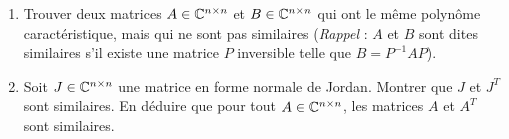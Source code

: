 \begin{enumerate}
\item Trouver deux matrices $A \in \Bbb C^{n \times n}$ et $B \in \Bbb C^{n \times n}$ qui ont le même polynôme caractéristique, mais qui ne sont pas similaires (\emph{Rappel} : $A$ et $B$ sont dites similaires s'il existe une matrice $P$ inversible telle que $B = P^{-1} A P$).

\item Soit $J \in \Bbb C^{n \times n}$ une matrice en forme normale de Jordan. Montrer que $J$ et $J^T$ sont similaires. En déduire que pour tout $A \in \Bbb C^{n \times n}$, les matrices $A$ et $A^T$ sont similaires.
\end{enumerate}

